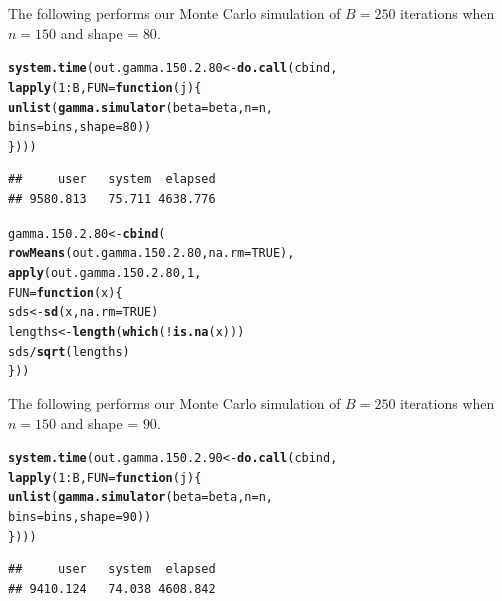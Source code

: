 \documentclass[11pt]{article}\usepackage[]{graphicx}\usepackage[]{color}
\makeatletter
\newcommand{\hlnum}[1]{\textcolor[rgb]{0.686,0.059,0.569}{#1}}%
\newcommand{\hlopt}[1]{\textcolor[rgb]{0,0,0}{#1}}%
\newcommand{\hlstd}[1]{\textcolor[rgb]{0.345,0.345,0.345}{#1}}%
\newcommand{\hlkwa}[1]{\textcolor[rgb]{0.161,0.373,0.58}{\textbf{#1}}}%
\newcommand{\hlkwb}[1]{\textcolor[rgb]{0.69,0.353,0.396}{#1}}%
\newcommand{\hlkwc}[1]{\textcolor[rgb]{0.333,0.667,0.333}{#1}}%
\newcommand{\hlkwd}[1]{\textcolor[rgb]{0.737,0.353,0.396}{\textbf{#1}}}%
\newenvironment{kframe}{%
 \def\at@end@of@kframe{}%
 \ifinner\ifhmode%
  \def\at@end@of@kframe{\end{minipage}}%
  \begin{minipage}{\columnwidth}%
 \fi\fi%
 \def\FrameCommand##1{\hskip\@totalleftmargin \hskip-\fboxsep
 \colorbox{shadecolor}{##1}\hskip-\fboxsep
     \hskip-\linewidth \hskip-\@totalleftmargin \hskip\columnwidth}%
 \MakeFramed {\advance\hsize-\width
   \@totalleftmargin\z@ \linewidth\hsize
   \@setminipage}}%
 {\par\unskip\endMakeFramed%
 \at@end@of@kframe}
\newenvironment{knitrout}{}{} %
\makeatother
\begin{document}
The following performs our Monte Carlo simulation of $B = 250$ iterations 
when $n = 150$ and shape = $80$.

\begin{knitrout}
\color{fgcolor}\begin{kframe}
\begin{alltt}
\hlkwd{system.time}\hlstd{(out.gamma.150.2.80} \hlkwb{<-} \hlkwd{do.call}\hlstd{(cbind,}
  \hlkwd{lapply}\hlstd{(}\hlnum{1}\hlopt{:}\hlstd{B,} \hlkwc{FUN} \hlstd{=} \hlkwa{function}\hlstd{(}\hlkwc{j}\hlstd{)\{}
    \hlkwd{unlist}\hlstd{(}\hlkwd{gamma.simulator}\hlstd{(}\hlkwc{beta} \hlstd{= beta,} \hlkwc{n} \hlstd{= n,}
      \hlkwc{bins} \hlstd{= bins,} \hlkwc{shape} \hlstd{=} \hlnum{80}\hlstd{))}
\hlstd{\})))}
\end{alltt}
\begin{verbatim}
##     user   system  elapsed 
## 9580.813   75.711 4638.776
\end{verbatim}
\end{kframe}
\end{knitrout}

\begin{knitrout}
\color{fgcolor}\begin{kframe}
\begin{alltt}
\hlstd{gamma.150.2.80} \hlkwb{<-} \hlkwd{cbind}\hlstd{(}
  \hlkwd{rowMeans}\hlstd{(out.gamma.150.2.80,} \hlkwc{na.rm} \hlstd{=} \hlnum{TRUE}\hlstd{),}
  \hlkwd{apply}\hlstd{(out.gamma.150.2.80,} \hlnum{1}\hlstd{,}
  \hlkwc{FUN} \hlstd{=} \hlkwa{function}\hlstd{(}\hlkwc{x}\hlstd{)\{}
    \hlstd{sds} \hlkwb{<-} \hlkwd{sd}\hlstd{(x,} \hlkwc{na.rm} \hlstd{=} \hlnum{TRUE}\hlstd{)}
    \hlstd{lengths} \hlkwb{<-} \hlkwd{length}\hlstd{(}\hlkwd{which}\hlstd{(}\hlopt{!}\hlkwd{is.na}\hlstd{(x)))}
    \hlstd{sds} \hlopt{/} \hlkwd{sqrt}\hlstd{(lengths)}
  \hlstd{\}))}
\end{alltt}
\end{kframe}
\end{knitrout}

The following performs our Monte Carlo simulation of $B = 250$ iterations 
when $n = 150$ and shape = $90$.

\begin{knitrout}
\color{fgcolor}\begin{kframe}
\begin{alltt}
\hlkwd{system.time}\hlstd{(out.gamma.150.2.90} \hlkwb{<-} \hlkwd{do.call}\hlstd{(cbind,}
  \hlkwd{lapply}\hlstd{(}\hlnum{1}\hlopt{:}\hlstd{B,} \hlkwc{FUN} \hlstd{=} \hlkwa{function}\hlstd{(}\hlkwc{j}\hlstd{)\{}
    \hlkwd{unlist}\hlstd{(}\hlkwd{gamma.simulator}\hlstd{(}\hlkwc{beta} \hlstd{= beta,} \hlkwc{n} \hlstd{= n,}
      \hlkwc{bins} \hlstd{= bins,} \hlkwc{shape} \hlstd{=} \hlnum{90}\hlstd{))}
\hlstd{\})))}
\end{alltt}
\begin{verbatim}
##     user   system  elapsed 
## 9410.124   74.038 4608.842
\end{verbatim}
\end{kframe}
\end{knitrout}
\end{document}
